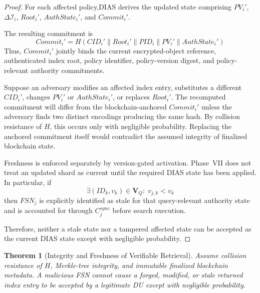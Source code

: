 \documentclass{ieeetj}
\theoremstyle{ieee-style}
\newtheorem{theorem}{Theorem}[subsection]
\begin{document}
\begin{proof}
For each affected policy,DIAS derives the updated state comprising $PV_i'$, $\Delta\mathcal{I}_i$, $Root_i'$, $AuthState_i'$, and $Commit_i'$.

The resulting commitment is
\begin{equation}
Commit_i'
=
H(CID_i'\parallel Root_i'\parallel PID_i
\parallel PV_i'\parallel AuthState_i')
\end{equation}
Thus, $Commit_i'$ jointly binds the current encrypted-object reference,
authenticated index root, policy identifier, policy-version digest, and
policy-relevant authority commitments.

Suppose an adversary modifies an affected index entry, substitutes a
different $CID_i'$, changes $PV_i'$ or $AuthState_i'$, or replaces
$Root_i'$. The recomputed commitment will differ from the
blockchain-anchored $Commit_i'$ unless the adversary finds two distinct
encodings producing the same hash. By collision resistance of $H$, this
occurs only with negligible probability. Replacing the anchored
commitment itself would contradict the assumed integrity of finalized
blockchain state.

Freshness is enforced separately by version-gated activation. Phase~VII
does not treat an updated shard as current until the required DIAS state
has been applied. In particular, if
\begin{equation}
\exists(ID_k,v_k)\in\mathbf{V}_Q:\;v_{j,k}<v_k
\end{equation}
then $FSN_j$ is explicitly identified as stale for that query-relevant
authority state and is accounted for through $C_j^{sync}$ before search
execution.

Therefore, neither a stale state nor a tampered affected state can be
accepted as the current DIAS state except with negligible probability.
\end{proof}


\begin{theorem}[Integrity and Freshness of Verifiable Retrieval]
Assume collision resistance of $H$, Merkle-tree integrity, and immutable
finalized blockchain metadata. A malicious FSN cannot cause a forged,
modified, or stale returned index entry to be accepted by a legitimate DU
except with negligible probability.
\end{theorem}
\end{document}

